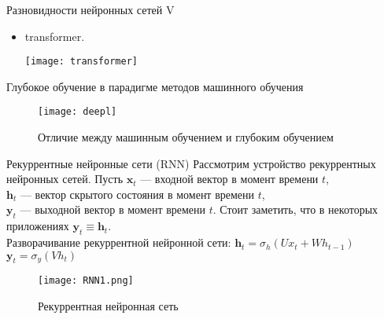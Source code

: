 \documentclass[11pt]{beamer}
\begin{document}
	
	\begin{frame}{Разновидности нейронных сетей V}
		\begin{itemize}			
			\item transformer.
			\begin{center}
				\begin{minipage}{0.51\linewidth}
					\centering
					\texttt{[image: transformer]}
				\end{minipage}
			\end{center}
		\end{itemize}
		
	\end{frame}

	\begin{frame}{Глубокое обучение в парадигме методов машинного обучения}
		\begin{figure}[H]
			\begin{center}
				\texttt{[image: deepl]}
			\end{center}
			\caption{Отличие между машинным обучением и глубоким обучением}
		\end{figure}
	\end{frame}

  \begin{frame}{Рекуррентные нейронные сети (RNN)}
	Рассмотрим устройство рекуррентных нейронных сетей. 
	Пусть $\boldsymbol{x}_t$ — входной вектор в момент времени $t$,\\ $\boldsymbol{h}_t$ — вектор скрытого состояния в момент времени $t$,\\
	$\boldsymbol{y}_t$ — выходной вектор в момент времени $t$. Стоит заметить, что в некоторых приложениях
	$\boldsymbol{y}_t \equiv \boldsymbol{h}_t$. \\
	Разворачивание рекуррентной нейронной сети:
	$\boldsymbol{h}_t = \sigma_h(Ux_t + Wh_{t-1})$\\
	$\boldsymbol{y}_t = \sigma_y (Vh_t) $ 
	    \begin{figure}
	        \centering
	        \texttt{[image: RNN1.png]}
	        \caption{Рекуррентная нейронная сеть}
	        \label{fig:my_label}
	    \end{figure}


	\end{frame}
\end{document}
